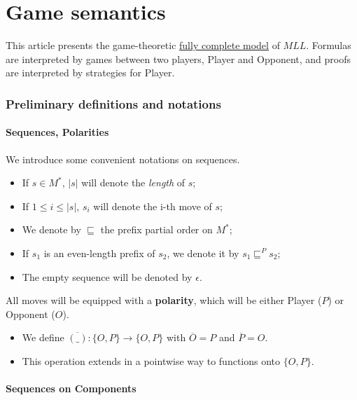 \chapter{Game semantics}\label{game-semantics}

This article presents the game-theoretic
\href{fully_complete_model}{fully complete model} of \(MLL\). Formulas
are interpreted by games between two players, Player and Opponent, and
proofs are interpreted by strategies for Player.

\subsection{Preliminary definitions and
notations}\label{preliminary-definitions-and-notations}

\subsubsection{Sequences, Polarities}\label{sequences-polarities}

We introduce some convenient notations on sequences.

\begin{itemize}
\tightlist
\item
  If \(s\in M^*\), \(|s|\) will denote the \emph{length} of \(s\);
\item
  If \(1\leq i\leq |s|\), \(s_i\) will denote the i-th move of \(s\);
\item
  We denote by \(\sqsubseteq\) the prefix partial order on \(M^*\);
\item
  If \(s_1\) is an even-length prefix of \(s_2\), we denote it by
  \(s_1\sqsubseteq^P s_2\);
\item
  The empty sequence will be denoted by \(\epsilon\).
\end{itemize}

All moves will be equipped with a \textbf{polarity}, which will be
either Player (\(P\)) or Opponent (\(O\)).

\begin{itemize}
\tightlist
\item
  We define \(\overline{(\_)}:\{O,P\}\to \{O,P\}\) with
  \(\overline{O} = P\) and \(\overline{P} = O\).
\item
  This operation extends in a pointwise way to functions onto
  \(\{O,P\}\).
\end{itemize}

\subsubsection{Sequences on Components}\label{sequences-on-components}

